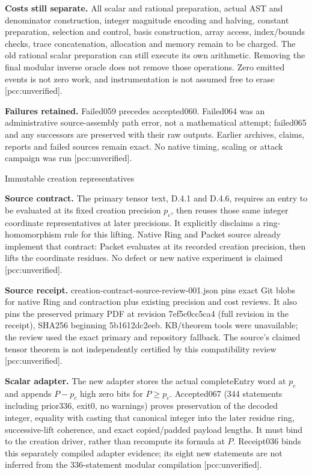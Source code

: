 \documentclass[10pt]{article}
\begin{document}
\textbf{Costs still separate.} All scalar and rational preparation, actual
AST and denominator construction, integer magnitude encoding and halving,
constant preparation, selection and control, basis construction, array access,
index/bounds checks, trace concatenation, allocation and memory remain to be
charged. The old rational scalar preparation can still execute its own
arithmetic. Removing the final modular inverse oracle does not remove those
operations. Zero emitted events is not zero work, and instrumentation is not
assumed free to erase [pcc:unverified].

\textbf{Failures retained.} Failed059 precedes accepted060. Failed064 was an
administrative source-assembly path error, not a mathematical attempt;
failed065 and any successors are preserved with their raw outputs. Earlier
archives, claims, reports and failed sources remain exact. No native timing,
scaling or attack campaign was run [pcc:unverified].
\newpage
\begin{center}{\Large Immutable creation representatives}\end{center}
\textbf{Source contract.} The primary tensor text, D.4.1 and D.4.6, requires
an entry to be evaluated at its fixed creation precision $p_c$, then reuses
those same integer coordinate representatives at later precisions. It
explicitly disclaims a ring-homomorphism rule for this lifting. Native Ring
and Packet source already implement that contract: Packet evaluates at its
recorded creation precision, then lifts the coordinate residues. No defect
or new native experiment is claimed [pcc:unverified].

\textbf{Source receipt.} creation-contract-source-review-001.json pins exact
Git blobs for native Ring and contraction plus existing precision and cost
reviews. It also pins the preserved primary PDF at revision
7ef5c0cc5ca4 (full revision in the receipt), SHA256 beginning
5b1612dc2eeb. KB/theorem tools were unavailable; the review used the exact
primary and repository fallback. The source's claimed tensor theorem is not
independently certified by this compatibility review [pcc:unverified].

\textbf{Scalar adapter.} The new adapter stores the actual completeEntry
word at $p_c$ and appends $P-p_c$ high zero bits for $P\ge p_c$. Accepted067 (344 statements including prior336, exit0, no warnings) proves preservation of the decoded integer, equality with
casting that canonical integer into the later residue ring, successive-lift
coherence, and exact copied/padded payload lengths. It must bind to the
creation driver, rather than recompute its formula at $P$. Receipt036 binds this separately compiled adapter evidence; its eight new
statements are not inferred from the 336-statement modular compilation [pcc:unverified].
\end{document}
